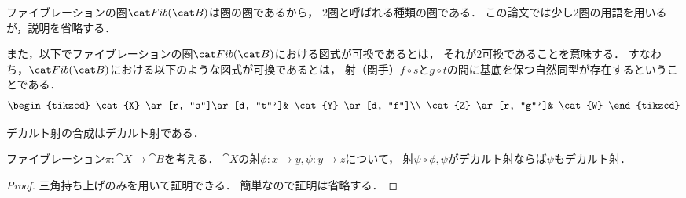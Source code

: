     \begin{Remark}
        ファイブレーションの圏$\Fib{B}$は圏の圏であるから，
        $2$圏と呼ばれる種類の圏である．
        この論文では少し$2$圏の用語を用いるが，説明を省略する．

        また，以下でファイブレーションの圏$\Fib{B}$における図式が可換であるとは，
        それが$2$可換であることを意味する．
        すなわち，$\Fib{B}$における以下のような図式が可換であるとは，
        射（関手）$f \circ s$と$g \circ t$の間に基底を保つ自然同型が存在するということである．
        \[
        \begin{tikzcd}
            \cat{X} \ar[r, "s"]\ar[d, "t"']& \cat{Y} \ar[d, "f"]\\
            \cat{Z} \ar[r, "g"']& \cat{W}
        \end{tikzcd}
        \]
    \end{Remark}

    \begin{Prop}\nocite{Vistoli07}
    \begin{myenum}
    \item
        デカルト射の合成はデカルト射である．
    \item
        ファイブレーション$\pi \colon \cat{X} \to \cat{B}$を考える．
        $\cat{X}$の射$\phi \colon x \to y, \psi \colon y \to z$について，
        射$\psi \circ \phi, \psi$がデカルト射ならば$\psi$もデカルト射．
    \end{myenum}
    \end{Prop}
    \begin{proof}
        三角持ち上げのみを用いて証明できる．
        簡単なので証明は省略する．
    \end{proof}

